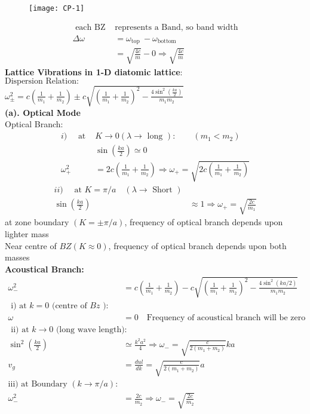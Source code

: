 \begin{figure}[H]
	\centering
	\texttt{[image: CP-1]}
\end{figure}
\begin{align*}
\text { each BZ  }&\text{represents a Band, so band width}\\
\Delta \omega &=\omega_{\text {top }}-\omega_{\text {bottom }} \\
&=\sqrt{\frac{4 c}{m}}-0 \Rightarrow \sqrt{\frac{4 c}{m}}
\end{align*}
\textbf{Lattice Vibrations in 1-D diatomic lattice}:\\
$\text{Dispersion Relation}:$\\
$\omega_{\pm}^{2}=c\left(\frac{1}{m_{1}}+\frac{1}{m_{2}}\right) \pm c \sqrt{\left(\frac{1}{m_{1}}+\frac{1}{m_{2}}\right)^{2}-\frac{4 \sin ^{2}\left(\frac{k a}{2}\right)}{m_{1} m_{2}}}$\\
\textbf{(a). Optical Mode}\\
Optical Branch:\\
\begin{align*}
i)\quad \text { at }& K \rightarrow 0(\lambda \rightarrow \text { long }):\qquad\left(m_{1}<m_{2}\right)\\
&\sin \left(\frac{k a}{2}\right) \simeq 0\\
\omega_{+}^{2}&=2 c\left(\frac{1}{m_{1}}+\frac{1}{m_{2}}\right) \Rightarrow \omega_{+}=\sqrt{2 c\left(\frac{1}{m_{1}}+\frac{1}{m_{2}}\right)}
\end{align*}
\begin{align*}
ii)\quad \text { at } K=\pi/a \quad(\lambda \rightarrow \text { Short })\\
\sin \left(\frac{k a}{2}\right) &\approx 1 \Rightarrow \omega_{+}=\sqrt{\frac{2 c}{m_{1}}}
\end{align*}
at zone boundary $(K=\pm \pi/a)$, frequency of optical branch depends upon lighter mass\\
Near centre of $BZ(K\approx 0)$, frequency of optical branch depends upon both masses\\
\textbf{Acoustical Branch:}
\begin{align*}
\omega_{-}^{2}&=c\left(\frac{1}{m_{1}}+\frac{1}{m_{2}}\right)-c \sqrt{\left(\frac{1}{m_{1}}+\frac{1}{m_{2}}\right)^{2}-\frac{4 \sin ^{2}(k a / 2)}{m_{1} m_{2}}}\\
\text { i) at } k=0 \text { (centre of } B z \text { ): }&\\
\omega&=0 \quad \text{Frequency of acoustical branch will be zero}\\
\text { ii) at } k \rightarrow 0 \text { (long wave length): }&\\
\sin ^{2}\left(\frac{k a}{2}\right) &\simeq \frac{k^{2} a^{2}}{4} \Rightarrow \omega_{-}=\sqrt{\frac{c}{2\left(m_{1}+m_{2}\right)}} k a\\
v_{g}&=\frac{d u l}{d k}=\sqrt{\frac{c}{2\left(m_{1}+m_{2}\right)}} a\\
\text{iii) at Boundary }(k \rightarrow \pi / a):&\\
\omega_{-}^{2}&=\frac{2 c}{m_{2}} \Rightarrow \omega_{-}=\sqrt{\frac{2 c}{m_{2}}}
\end{align*}
